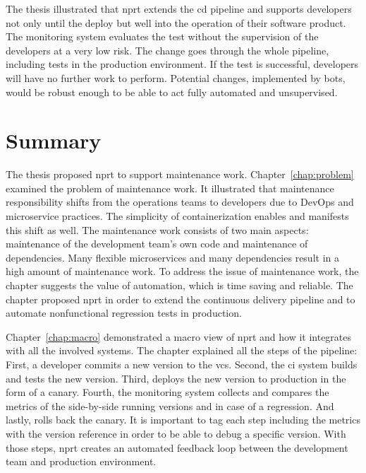 The thesis illustrated that \gls{nprt} extends the \gls{cd} pipeline and supports
developers not only until the deploy but well into the operation of their software
product. The monitoring system evaluates the test without the supervision of the
developers at a very low risk. The change goes through the whole pipeline, including tests
in the production environment. If the test is successful, developers will have no further
work to perform. Potential changes, implemented by bots, would be robust enough to be able
to act fully automated and unsupervised.

\section{Summary}

The thesis proposed \gls{nprt} to support maintenance work. Chapter~\ref{chap:problem}
examined the problem of maintenance work. It illustrated that maintenance responsibility
shifts from the operations teams to developers due to DevOps and microservice
practices. The simplicity of containerization enables and manifests this shift as
well. The maintenance work consists of two main aspects: maintenance of the development
team’s own code and maintenance of dependencies. Many flexible microservices and many
dependencies result in a high amount of maintenance work. To address the issue of
maintenance work, the chapter suggests the value of automation, which is time saving and
reliable. The chapter proposed \gls{nprt} in order to extend the continuous delivery
pipeline and to automate nonfunctional regression tests in production.

Chapter~\ref{chap:macro} demonstrated a macro view of \gls{nprt} and how it integrates
with all the involved systems. The chapter explained all the steps of the pipeline: First,
a developer commits a new version to the \gls{vcs}. Second, the \gls{ci} system builds and
tests the new version. Third, \deployer{} deploys the new version to production in the form
of a canary. Fourth, the monitoring system collects and compares the metrics of the
side-by-side running versions and in case of a regression. And lastly, \deployer{} rolls back the
canary. It is important to tag each step including the metrics with the version reference
in order to be able to debug a specific version. With those steps, \gls{nprt} creates an
automated feedback loop between the development team and production environment.

